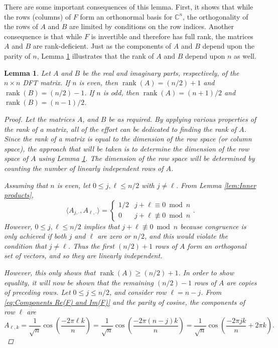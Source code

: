 \documentclass[12pt]{article}
\newcommand{\rank}{\operatorname{rank}}	%
\newtheorem{lemma}{Lemma}[section]
\begin{document}
There are some important consequences of this lemma. First, it shows that while the rows (columns) of $F$ form an orthonormal basis for $\mathbb{C}^n$, the orthogonality of the rows of $A$ and $B$ are limited by conditions on the row indices. Another consequence is that while $F$ is invertible and therefore has full rank, the matrices $A$ and $B$ are rank-deficient. Just as the components of $A$ and $B$ depend upon the parity of $n$, Lemma \ref{lem:Rank of A and B} illustrates that the rank of $A$ and $B$ depend upon $n$ as well.

\begin{lemma}
\label{lem:Rank of A and B}
Let $A$ and $B$ be the real and imaginary parts, respectively, of the $n \times n$ DFT matrix. If $n$ is even, then $\rank(A) = (n/2)+1$ and $\rank(B) = (n/2)-1$. If $n$ is odd, then $\rank(A) = (n+1)/2$ and $\rank(B) = (n-1)/2$. 
\begin{proof}
Let the matrices $A$, and $B$ be as required. By applying various properties of the rank of a matrix, all of the effort can be dedicated to finding the rank of $A$. Since the rank of a matrix is equal to the dimension of the row space (or column space), the approach that will be taken is to determine the dimension of the row space of $A$ using Lemma \ref{lem:Rank of A and B}. The dimension of the row space will be determined by counting the number of linearly independent rows of $A$. \par 
Assuming that $n$ is even, let $0 \leq j,\ell \leq n/2$ with $j \neq \ell$. From Lemma \ref{lem:Inner products},
\[\langle A_{j,\cdot},A_{\ell,\cdot}\rangle = \begin{cases}
1/2 & j+\ell \equiv 0 \bmod n \\
0 & j+\ell \not\equiv 0 \bmod n
\end{cases}.\]
However, $0 \leq j,\ell \leq n/2$ implies that $j+\ell \not\equiv 0 \bmod n$ because congruence is only achieved if both $j$ and $\ell$ are zero or $n/2$, and this would violate the condition that $j \neq \ell$. Thus the first $(n/2)+1$ rows of $A$ form an orthogonal set of vectors, and so they are linearly independent. \par 
However, this only shows that $\rank(A) \geq (n/2)+1$. In order to show equality, it will now be shown that the remaining $(n/2)-1$ rows of $A$ are copies of preceding rows. Let $0 \leq j \leq n/2$, and consider row $\ell = n - j$. From \eqref{eq:Components Re(F) and Im(F)} and the parity of cosine, the components of row $\ell$ are
\[A_{\ell,{k}} = \frac{1}{\sqrt{n}}\cos\left(\frac{-2\pi{\ell{k}}}{n}\right) = \frac{1}{\sqrt{n}}\cos\left(\frac{-2\pi{(n-j){k}}}{n}\right) = \frac{1}{\sqrt{n}}\cos\left(\frac{-2\pi{jk}}{n} + 2\pi{k}\right).\]

\end{proof}
\end{lemma}
\end{document}
